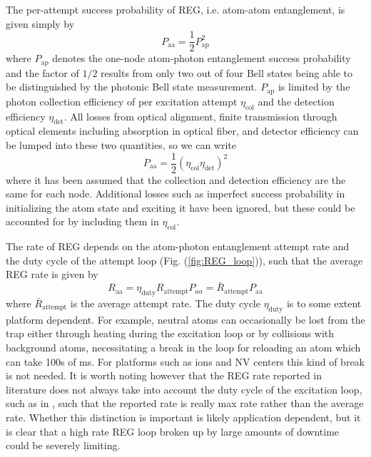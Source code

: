 The per-attempt success probability of REG, i.e. atom-atom entanglement, is given simply by
\begin{equation}
    P_{\text{aa}} = \frac{1}{2}P_{\text{ap}}^2
\end{equation}
where $P_{\text{ap}}$ denotes the one-node atom-photon entanglement success probability and the factor of $1/2$ results from only two out of four Bell states being able to be distinguished by the photonic Bell state measurement. $P_{\text{ap}}$ is limited by the photon collection efficiency of per excitation attempt $\eta_{\text{col}}$ and the detection efficiency $\eta_{\text{det}}$. All losses from optical alignment, finite transmission through optical elements including absorption in optical fiber, and detector efficiency can be lumped into these two quantities, so we can write 
\begin{equation}
    P_{\text{aa}} = \frac{1}{2}\left(\eta_{\text{col}}\eta_{\text{det}}\right)^2
\end{equation}
where it has been assumed that the collection and detection efficiency are the same for each node. Additional losses such as imperfect success probability in initializing the atom state and exciting it have been ignored, but these could be accounted for by including them in $\eta_{\text{col}}$.

The rate of REG depends on the atom-photon entanglement attempt rate and the duty cycle of the attempt loop (Fig. (\ref{fig:REG_loop})), such that the average REG rate is given by
\begin{equation}\label{eq:Raa}
    R_{\text{aa}} = \eta_{\text{duty}}R_{\text{attempt}}P_{a   a} = \bar{R}_{\text{attempt}}P_{\text{aa}}
\end{equation}
where $\bar{R}_{\text{attempt}}$ is the average attempt rate. The duty cycle $\eta_{\text{duty}}$ is to some extent platform dependent. For example, neutral atoms can occasionally be lost from the trap either through heating during the excitation loop or by collisions with background atoms, necessitating a break in the loop for reloading an atom which can take 100s of ms. For platforms such as ions and NV centers this kind of break is not needed. It is worth noting however that the REG rate reported in literature does not always take into account the duty cycle of the excitation loop, such as in \cite{Young2022}, such that the reported rate is really max rate rather than the average rate. Whether this distinction is important is likely application dependent, but it is clear that a high rate REG loop broken up by large amounts of downtime could be severely limiting.

